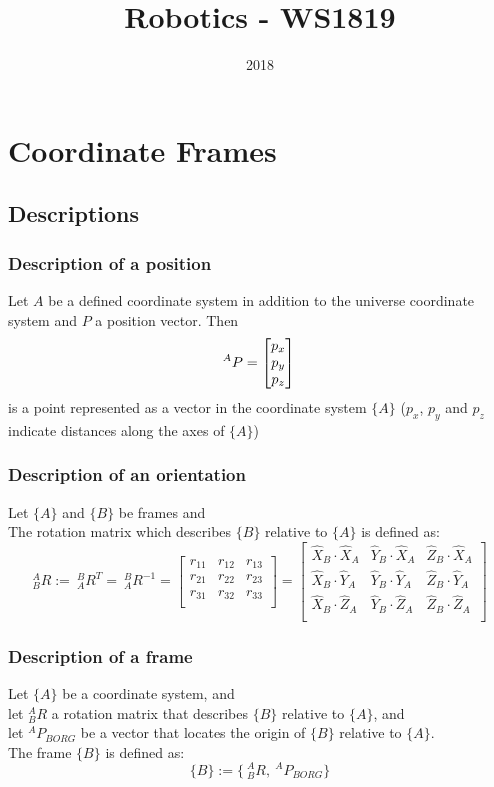 \documentclass[10pt,a4paper]{article}
\title{Robotics - WS1819}
\author{}
\date{2018}
\newcommand{\vect}[1]{\ensuremath{\begin{bmatrix}#1\end{bmatrix}}}
\begin{document}
	
\section{Coordinate Frames}
\subsection{Descriptions}

\subsubsection{Description of a position}
Let $A$ be a defined coordinate system in addition to the universe coordinate system and $P$ a position vector. Then \\
\begin{equation*}
^AP = \vect{p_x \\ p_y \\ p_z} \\
\end{equation*}
is a point represented as a vector in the coordinate system $\{A\}$ ($p_x$, $p_y$ and $p_z$ indicate distances along the axes of $\{A\}$)


\subsubsection{Description of an orientation}
Let $\{A\}$ and $\{B\}$ be frames and \\
The rotation matrix which describes $\{B\}$ relative to $\{A\}$ is defined as:
\begin{equation*}
_B^AR := ~^B_AR^T = ~^B_AR^{-1} = \begin{bmatrix}
r_{11} & r_{12} & r_{13} \\
r_{21} & r_{22} & r_{23} \\
r_{31} & r_{32} & r_{33} \\
\end{bmatrix} = \begin{bmatrix}
\hat{X}_B ⋅ \hat{X}_A & \hat{Y}_B ⋅ \hat{X}_A & \hat{Z}_B ⋅ \hat{X}_A \\
\hat{X}_B ⋅ \hat{Y}_A & \hat{Y}_B ⋅ \hat{Y}_A & \hat{Z}_B ⋅ \hat{Y}_A \\
\hat{X}_B ⋅ \hat{Z}_A & \hat{Y}_B ⋅ \hat{Z}_A & \hat{Z}_B ⋅ \hat{Z}_A \\
\end{bmatrix}
\end{equation*}

\subsubsection{Description of a frame}
Let $\{A\}$ be a coordinate system, and \\
let $^A_BR$ a rotation matrix that describes $\{B\}$ relative to $\{A\}$, and \\
let $^AP_{BORG}$ be a vector that locates the origin of $\{B\}$ relative to $\{A\}$. \\
The frame $\{B\}$ is defined as:
\begin{equation*}
\{B\} := \{~^A_BR, ~^AP_{BORG}\}
\end{equation*}
\end{document}

